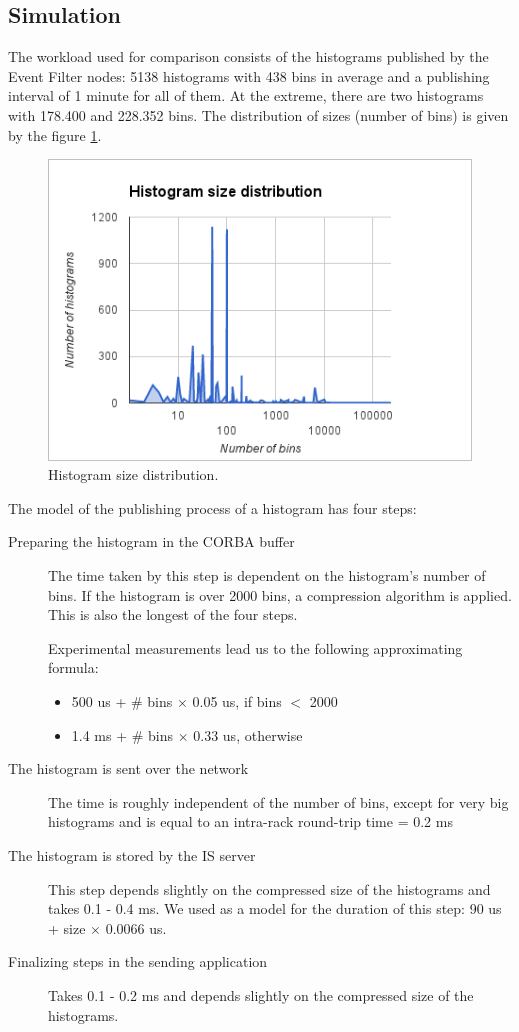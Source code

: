 \subsection{Simulation}

The workload used for comparison consists of the histograms published by the Event Filter nodes: 5138 histograms with 438 bins in average and a publishing interval of 1 minute for all of them. At the extreme, there are two histograms with 178.400 and 228.352 bins. The distribution of sizes (number of bins) is given by the figure \ref{fig:histosize}.

\begin{figure}[ht]
\centering
\includegraphics[scale=0.6]{Images/histo_distrib.png}
\caption{Histogram size distribution.}
\label{fig:histosize}
\end{figure}


The model of the publishing process of a histogram has four steps: 
\begin{description}
\item [Preparing the histogram in the CORBA buffer]
The time taken by this step is dependent on the histogram's number of bins. If the histogram is over 2000 bins, a compression algorithm is applied. This is also the longest of the four steps.

Experimental measurements lead us to the following approximating formula:
\begin{itemize}
\item 500 us + \# bins $\times$ 0.05 us, if bins $<$ 2000
\item 1.4 ms + \# bins $\times$ 0.33 us, otherwise 
\end{itemize}
\item[The histogram is sent over the network]
The time is roughly independent of the number of bins, except for very big histograms and is equal to an intra-rack round-trip time = 0.2 ms
\item[The histogram is stored by the IS server]
This step depends slightly on the compressed size of the histograms and takes 0.1 - 0.4 ms. We used as a model for the duration of this step: 90 us + size $\times$ 0.0066 us.
\item[Finalizing steps in the sending application]
Takes 0.1 - 0.2 ms and depends slightly on the compressed size of the histograms.
\end{description}

